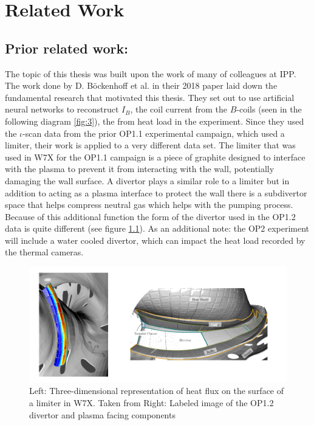 %
\chapter{Related Work}
\label{sec:related}

\section{Prior related work: }

The topic of this thesis was built upon the work of many of colleagues at IPP. The work done by D. Böckenhoff et al. in their 2018 paper \cite{Böckenhoff_2018} laid down the fundamental research that motivated this thesis. They set out to use artificial neural networks to reconstruct $I_B$, the coil current from the $B$-coils (seen in the following diagram \ref{fig:3}), the from heat load in the experiment. Since they used the $\iota$-scan data from the prior OP1.1 experimental campaign, which used a limiter, their work is applied to a very different data set. The limiter that was used in W7X for the OP1.1 campaign is a piece of graphite designed to interface with the plasma to prevent it from interacting with the wall, potentially damaging the wall surface. A divertor plays a similar role to a limiter but in addition to acting as a plasma interface to protect the wall there is a subdivertor space that helps compress neutral gas which helps with the pumping process. Because of this additional function the form of the divertor used in the OP1.2 data is quite different (see figure \ref{fig:limiter-divertor}). As an additional note: the OP2 experiment will include a water cooled divertor, which can impact the heat load recorded by the thermal cameras.

\begin{figure}[!htb]
    \centering
    \includegraphics[width = \textwidth]{images/limiter-divetor.png}
    \caption{Left: Three-dimensional representation of heat flux on the surface of a limiter in W7X. Taken from \cite{Böckenhoff_2018} Right: Labeled image of the OP1.2 divertor and plasma facing components} \label{fig:limiter-divertor}
\end{figure}

